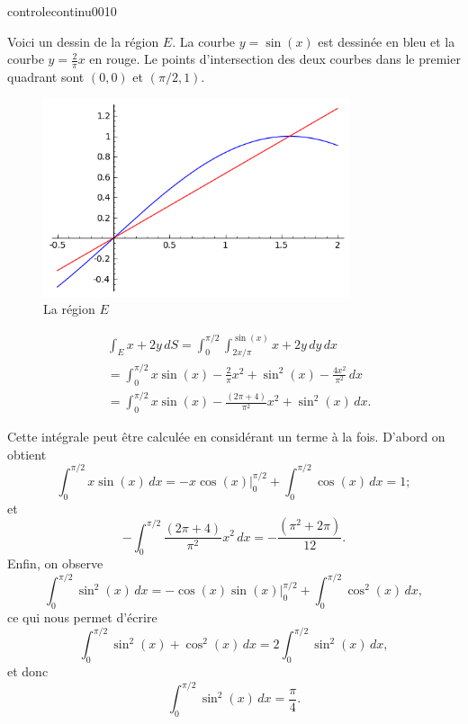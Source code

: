 \begin{corrige}{controlecontinu0010}

Voici un dessin de la région $E$.  La courbe $y=\sin(x)$ est dessinée en bleu et la courbe  $y=\frac{2}{\pi}x$ en rouge. Le points d'intersection des deux courbes dans le premier quadrant sont $(0,0)$  et $(\pi/2, 1)$. 
\begin{figure}
  \begin{center}
            \includegraphics[width=9cm]{premiere_epreuve_exo5.png}
  \caption{La région $E$}
  \end{center}
 \end{figure}
 
\begin{equation}
  \begin{aligned}
    &\int_{E}x+2y \, dS=\int_0^{\pi/2}\int_{2x/\pi}^{\sin(x)} x+2y\, dy\,dx\\
    &=\int_0^{\pi/2}x\sin(x)-\frac{2}{\pi}x^2+\sin^2(x)-\frac{4x^2}{\pi^2}\,dx\\
    &=\int_0^{\pi/2}x\sin(x)-\frac{(2\pi+ 4)}{\pi^2}x^2+\sin^2(x)\,dx.
  \end{aligned}
\end{equation}

Cette intégrale peut être calculée en considérant un terme à la fois. D'abord on obtient
\[
\int_0^{\pi/2}x\sin(x)\,dx=\left.-x\cos(x)\right\vert_{0}^{\pi/2}+\int_0^{\pi/2}\cos(x)\,dx=1 ;
\]
et
\[
-\int_0^{\pi/2}\frac{(2\pi+ 4)}{\pi^2}x^2 \,dx=-\frac{(\pi^2+ 2\pi)}{12}.
\]
Enfin, on observe 
\[
\int_0^{\pi/2}\sin^2(x)\,dx=\left. -\cos(x)\sin(x)\right\vert_{0}^{\pi/2}+ \int_0^{\pi/2}\cos^2(x)\,dx,
\]
ce qui nous permet d'écrire
 \[
\int_0^{\pi/2}\sin^2(x)+\cos^2(x) \,dx=2 \int_0^{\pi/2}\sin^2(x)\,dx,
\]
et donc
\[
\int_0^{\pi/2}\sin^2(x)\,dx=\frac{\pi}{4}.
\]
\end{corrige}
